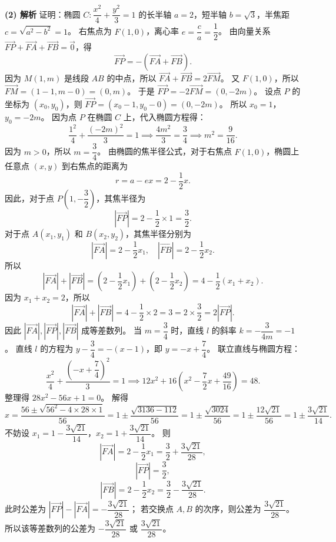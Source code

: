 \begin{answer}
\textbf{(2) 解析} 证明：椭圆 $C: \dfrac{x^2}{4} + \dfrac{y^2}{3} = 1$ 的长半轴 $a = 2$，短半轴 $b = \sqrt3$，半焦距 $c = \sqrt{a^2 - b^2} = 1$。
右焦点为 $F(1, 0)$，离心率 $e = \dfrac{c}{a} = \dfrac12$。
由向量关系 $\overrightarrow{FP} + \overrightarrow{FA} + \overrightarrow{FB} = \vec 0$，得
\nopagebreak[4]
\[\overrightarrow{FP} = -(\overrightarrow{FA} + \overrightarrow{FB}).\]
因为 $M(1, m)$ 是线段 $AB$ 的中点，所以 $\overrightarrow{FA} + \overrightarrow{FB} = 2\overrightarrow{FM}$。
又 $F(1, 0)$，所以 $\overrightarrow{FM} = (1 - 1, m - 0) = (0, m)$。
于是 $\overrightarrow{FP} = -2\overrightarrow{FM} = (0, -2m)$。
设点 $P$ 的坐标为 $(x_0, y_0)$，则 $\overrightarrow{FP} = (x_0 - 1, y_0 - 0) = (0, -2m)$。
所以 $x_0 = 1$，$y_0 = -2m$。
因为点 $P$ 在椭圆 $C$ 上，代入椭圆方程得：
\nopagebreak[4]
\[\dfrac{1^2}{4} + \dfrac{(-2m)^2}{3} = 1 \implies \dfrac{4m^2}{3} = \dfrac34 \implies m^2 = \dfrac{9}{16}.\]
因为 $m > 0$，所以 $m = \dfrac34$。
由椭圆的焦半径公式，对于右焦点 $F(1, 0)$，椭圆上任意点 $(x, y)$ 到右焦点的距离为
\nopagebreak[4]
\[r = a - ex = 2 - \dfrac12 x.\]
因此，对于点 $P\left(1, -\dfrac32\right)$，其焦半径为
\nopagebreak[4]
\[|\overrightarrow{FP}| = 2 - \dfrac12 \times 1 = \dfrac32.\]
对于点 $A(x_1, y_1)$ 和 $B(x_2, y_2)$，其焦半径分别为
\nopagebreak[4]
\[|\overrightarrow{FA}| = 2 - \dfrac12 x_1, \quad |\overrightarrow{FB}| = 2 - \dfrac12 x_2.\]
所以
\nopagebreak[4]
\[|\overrightarrow{FA}| + |\overrightarrow{FB}| = \left(2 - \dfrac12 x_1\right) + \left(2 - \dfrac12 x_2\right) = 4 - \dfrac12 (x_1 + x_2).\]
因为 $x_1 + x_2 = 2$，所以
\nopagebreak[4]
\[|\overrightarrow{FA}| + |\overrightarrow{FB}| = 4 - \dfrac12 \times 2 = 3 = 2 \times \dfrac32 = 2|\overrightarrow{FP}|.\]
因此 $|\overrightarrow{FA}|, |\overrightarrow{FP}|, |\overrightarrow{FB}|$ 成等差数列。
当 $m = \dfrac34$ 时，直线 $l$ 的斜率 $k = -\dfrac{3}{4m} = -1$。
直线 $l$ 的方程为 $y - \dfrac34 = -(x - 1)$，即 $y = -x + \dfrac74$。
联立直线与椭圆方程：
\nopagebreak[4]
\[\dfrac{x^2}{4} + \dfrac{\left(-x + \dfrac74\right)^2}{3} = 1 \implies 12x^2 + 16\left(x^2 - \dfrac72 x + \dfrac{49}{16}\right) = 48.\]
整理得 $28x^2 - 56x + 1 = 0$。
解得
\nopagebreak[4]
\[x = \dfrac{56 \pm \sqrt{56^2 - 4 \times 28 \times 1}}{56} = 1 \pm \dfrac{\sqrt{3136 - 112}}{56} = 1 \pm \dfrac{\sqrt{3024}}{56} = 1 \pm \dfrac{12\sqrt{21}}{56} = 1 \pm \dfrac{3\sqrt{21}}{14}.\]
不妨设 $x_1 = 1 - \dfrac{3\sqrt{21}}{14}$，$x_2 = 1 + \dfrac{3\sqrt{21}}{14}$。
则
\nopagebreak[4]
\[|\overrightarrow{FA}| = 2 - \dfrac12 x_1 = \dfrac32 + \dfrac{3\sqrt{21}}{28},\]
\nopagebreak[4]
\[|\overrightarrow{FP}| = \dfrac32,\]
\nopagebreak[4]
\[|\overrightarrow{FB}| = 2 - \dfrac12 x_2 = \dfrac32 - \dfrac{3\sqrt{21}}{28}.\]
此时公差为 $|\overrightarrow{FP}| - |\overrightarrow{FA}| = -\dfrac{3\sqrt{21}}{28}$；
若交换点 $A, B$ 的次序，则公差为 $\dfrac{3\sqrt{21}}{28}$。
所以该等差数列的公差为 $-\dfrac{3\sqrt{21}}{28}$ 或 $\dfrac{3\sqrt{21}}{28}$。


\end{answer}
